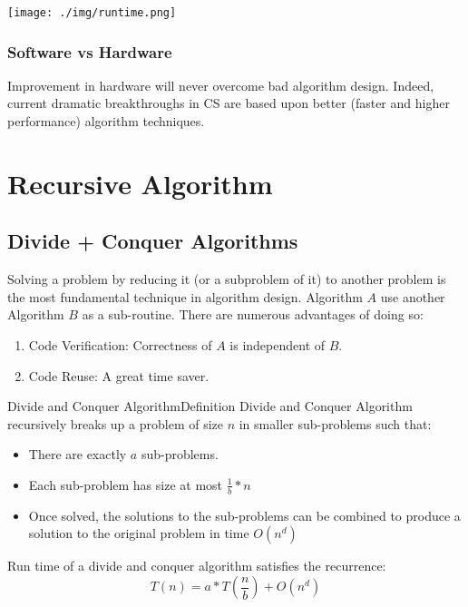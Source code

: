 \documentclass[11pt, a4paper, oneside]{book}
\theoremstyle{theoremdd}
\theoremstyle{remark}
\begin{document}
\begin{center}
\texttt{[image: ./img/runtime.png]}
\end{center}

\section*{Software vs Hardware}
Improvement in hardware will never overcome bad algorithm design. Indeed, current dramatic breakthroughs in CS are based upon better (faster and higher performance) algorithm techniques. 

\mainmatter

\part{Recursive Algorithm}
\chapter{Divide + Conquer Algorithms}
\noindent
Solving a problem by reducing it (or a subproblem of it) to another problem is the most fundamental technique in algorithm design. Algorithm $A$ use another Algorithm $B$ as a sub-routine. There are numerous advantages of doing so: 
\begin{enumerate}
\item Code Verification: Correctness of $A$ is independent of $B$.
\item Code Reuse: A great time saver.
\end{enumerate}

\begin{mytheo}{Divide and Conquer Algorithm}{Definition}
Divide and Conquer Algorithm recursively breaks up a problem of size $n$ in smaller sub-problems such that: 
\begin{itemize}
\item There are exactly $a$ sub-problems.
\item Each sub-problem has size at most $\frac{1}{b}*n$
\item Once solved, the solutions to the sub-problems can be combined to produce a solution to the original problem in time $O(n^{d})$
\end{itemize}
Run time of a divide and conquer algorithm satisfies the recurrence: 
\begin{equation*}
T(n) = a*T(\frac{n}{b}) + O(n^{d})
\end{equation*}
\end{mytheo}
\end{document}
